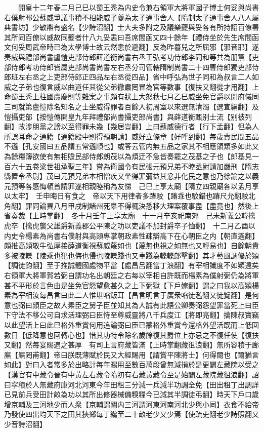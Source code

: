 　　開皇十二年春二月己巳以蜀王秀為内史令兼右領軍大將軍國子博士何妥與尚書右僕射邳公蘇威爭議事積不相能威子夔為太子通事舍人【隋制太子通事舍人八人屬典書坊】少敏辯有盛名【少詩沼翻】士大夫多附之及議樂夔與妥各有所持詔百僚署其所同百僚以威故同夔者什八九妥恚曰吾席間函丈四十餘年【禮侍坐於先生席間函文何妥周武帝時已為太學博士故云然恚於避翻】反為昨暮兒之所屈邪【邪音耶】遂奏威與禮部尚書盧愷吏部侍郎薛道衡尚書右丞王弘考功侍郎李同和等共為朋黨【吏部侍郎考功侍郎皆屬吏部尚書尚書左右丞分司管轄隋制尚書二十四曹侍郎獨吏部侍郎班左右丞之上吏部侍郎正四品左右丞從四品】省中呼弘為世子同和為叔言二人如威之子弟也復言威以曲道任其從父弟徹肅罔冒為官等數事【復扶又翻從才用翻】上命蜀王秀上柱國虞慶則等雜案之事頗有狀上大怒秋七月乙巳威坐免官爵以開府儀同三司就第盧愷除名知名之士坐威得罪者百餘人初周室以來選無清濁【選宣絹翻】及愷攝吏部【按愷傳開皇九年拜禮部尚書攝吏部尚書】與薛道衡甄别士流【别被列翻】故涉朋黨之謗以至得罪未幾【幾居豈翻】上曰蘇威德行者【行下孟翻】但為人所誤耳命之通籍【通籍殿中則得預朝請】威好立條章【好呼到翻】每歲責民間五品不遜【孔安國曰五品謂五常遜順也】或答云管内無五品之家其不相應領類多如此又為餘糧簿欲使有無相贍民部侍郎朗茂以為煩迂不急皆奏罷之茂基之子也【郎基見一百六十五卷梁世祖承聖三年】嘗為衛國令有民張元預兄弟不睦丞尉請加嚴刑【隋志縣置令丞尉】茂曰元預兄弟本相憎疾又坐得罪彌益其忿非化民之意也乃徐諭之以義元預等各感悔頓首請罪遂相親睦稱為友悌　己巳上享太廟【隋立四親廟各以孟月享以太牢】　壬申晦日有食之　帝以天下用律者多踳駮【踳乖也駮錯也踳尺允翻駮北角翻】罪同論異八月甲戌制諸州死辠不得輒決悉移大理案覆事盡【盡竟也】然後上省奏裁【上時掌翻】　冬十月壬午上享太廟　十一月辛亥祀南郊　己未新義公韓擒虎卒【擒虎襲父雄爵新義郡公平陳之功以吏議不加封爵卒子恤翻】　十二月乙酉以内史令楊素為尚書右僕射與高熲專掌朝政素性疎辯高下在心朝臣之内【朝直遙翻】頗推高熲敬牛弘厚接薛道衡視蘇威蔑如也【蔑無也視之如無也又輕易也】自餘朝貴多被陵轢【陵乘也犯也侮也侵也陵轢踐也又車踐為轢轢郎擊翻】其才藝風調優於熲【調徒鈞翻】至于推誠體國處物平當【處昌呂翻當丁浪翻】有宰相識度不如熲遠矣右領軍大將軍賀若弼自謂功名出朝廷之右每以宰相自許既而楊素為僕射弼仍為將軍甚不平形於言色由是坐免官怨望愈甚久之上下弼獄【下戶嫁翻】謂之曰我以高熲楊素為宰相汝每昌言曰此二人惟堪啗飯耳【昌言明言于廣衆啗徒濫翻又徒覽翻】是何意也弼曰熲臣之故人素臣之舅子臣並知其為人誠有此語公卿奏弼怨望罪當死上曰臣下守法不移公可自求活理弼曰臣恃至尊威靈將八千兵度江【將即亮翻】擒陳叔寶竊以此望活上曰此巳格外重賞何用追論弼曰臣已蒙格外重賞今還格外望活既而上低回數日【低降意也回轉心也】惜其功特令除名歲餘復其爵位上亦忌之不復任使【復扶又翻】然每宴賜遇之甚厚　有司上言府藏皆滿【上時掌翻藏徂浪翻】無所容積于廊廡【廡罔甫翻】帝曰朕既薄賦於民又大經賜用【謂賞平陳將士】何得爾也【爾猶言如此】對曰入者常多於出略計每年賜用至數百萬段曾無減損於是更闢左藏院以受之【漢官有中藏令晉有中黃左右藏令隋初有右藏黃藏令至是始闢左藏院藏徂浪翻】詔曰寜積於人無藏府庫河北河東今年田租三分減一兵減半功調全免【田出租丁出調詳已見前兵受田計畝為功以其所出修器械備糗糧今已減其半調徒弔翻】時天下戶口歲增京輔及三河地少而人衆【京輔謂關内三河謂河東河南河北少與小同】衣食不給帝乃發使四出均天下之田其狹鄉每丁纔至二十畝老少又少焉【使疏吏翻老少詩照翻又少音詩沼翻】

